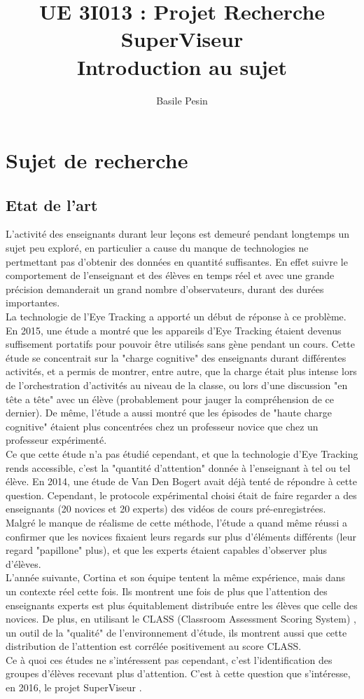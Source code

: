 \documentclass{article}
\title{UE 3I013 : Projet Recherche\\
    SuperViseur\\
    Introduction au sujet}
\author{Basile Pesin}
\begin{document}
\maketitle
\newpage

\section{Sujet de recherche}
\subsection{Etat de l'art}
L'activité des enseignants durant leur leçons est demeuré pendant longtemps un sujet peu exploré, en particulier a cause du manque de technologies ne pertmettant pas d'obtenir des données en quantité suffisantes. En effet suivre le comportement de l'enseignant et des élèves en temps réel et avec une grande précision demanderait un grand nombre d'observateurs, durant des durées importantes.\\
La technologie de l'Eye Tracking a apporté un début de réponse à ce problème. En 2015, une étude \cite{OrchestrationLoad} a montré que les appareils d'Eye Tracking étaient devenus suffisement portatifs pour pouvoir être utilisés sans gène pendant un cours. Cette étude se concentrait sur la "charge cognitive" des enseignants durant différentes activités, et a permis de montrer, entre autre, que la charge était plus intense lors de l'orchestration d'activités au niveau de la classe, ou lors d'une discussion "en tête a tête" avec un élève (probablement pour jauger la compréhension de ce dernier). De même, l'étude a aussi montré que les épisodes de "haute charge cognitive" étaient plus concentrées chez un professeur novice que chez un professeur expérimenté.\\
Ce que cette étude n'a pas étudié cependant, et que la technologie d'Eye Tracking rends accessible, c'est la "quantité d'attention" donnée à l'enseignant à tel ou tel élève. En 2014, une étude de Van Den Bogert \cite{VanDenBogert} avait déjà tenté de répondre à cette question. Cependant, le protocole expérimental choisi était de faire regarder a des enseignants (20 novices et 20 experts) des vidéos de cours pré-enregistrées. Malgré le manque de réalisme de cette méthode, l'étude a quand même réussi a confirmer que les novices fixaient leurs regards sur plus d'éléments différents (leur regard "papillone" plus), et que les experts étaient capables d'observer plus d'élèves.\\
L'année suivante, Cortina et son équipe \cite{Cortina} tentent la même expérience, mais dans un contexte réel cette fois. Ils montrent une fois de plus que l'attention des enseignants experts est plus équitablement distribuée entre les élèves que celle des novices. De plus, en utilisant le CLASS (Classroom Assessment Scoring System) \cite{CLASS}, un outil de la "qualité" de l'environnement d'étude, ils montrent aussi que cette distribution de l'attention est corrélée positivement au score CLASS.\\
Ce à quoi ces études ne s'intéressent pas cependant, c'est l'identification des groupes d'élèves recevant plus d'attention. C'est à cette question que s'intéresse, en 2016, le projet SuperViseur \cite{SuperViseur}.
\end{document}
